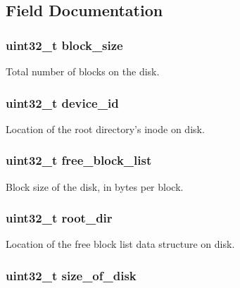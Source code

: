\subsection{Field Documentation}
\hypertarget{structsuperblock_a9e3fb1e50a1c71b2337df296222d9553}{
\subsubsection[{block\-\_\-size}]{\setlength{\rightskip}{0pt plus 5cm}uint32\-\_\-t block\-\_\-size}}\label{structsuperblock_a9e3fb1e50a1c71b2337df296222d9553}
Total number of blocks on the disk. \hypertarget{structsuperblock_a658c495cd1900eadce3b800e3ebdac7a}{
\subsubsection[{device\-\_\-id}]{\setlength{\rightskip}{0pt plus 5cm}uint32\-\_\-t device\-\_\-id}}\label{structsuperblock_a658c495cd1900eadce3b800e3ebdac7a}
Location of the root directory's inode on disk. \hypertarget{structsuperblock_a1ca5e6fd54241f9c2f848530a51bf66c}{
\subsubsection[{free\-\_\-block\-\_\-list}]{\setlength{\rightskip}{0pt plus 5cm}uint32\-\_\-t {\bf free\-\_\-block\-\_\-list}}}\label{structsuperblock_a1ca5e6fd54241f9c2f848530a51bf66c}
Block size of the disk, in bytes per block. \hypertarget{structsuperblock_aec71d39272df61eb33d94a4675d349be}{
\subsubsection[{root\-\_\-dir}]{\setlength{\rightskip}{0pt plus 5cm}uint32\-\_\-t root\-\_\-dir}}\label{structsuperblock_aec71d39272df61eb33d94a4675d349be}
Location of the free block list data structure on disk. \hypertarget{structsuperblock_a42dadb3b15d8f871bf1bc132b1ede650}{
\subsubsection[{size\-\_\-of\-\_\-disk}]{\setlength{\rightskip}{0pt plus 5cm}uint32\-\_\-t size\-\_\-of\-\_\-disk}}\label{structsuperblock_a42dadb3b15d8f871bf1bc132b1ede650}
